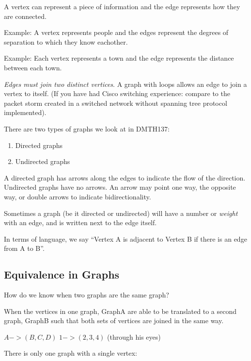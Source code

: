 A vertex can represent a piece of information and the edge represents how they
are connected.

Example: A vertex represents people and the edges represent the degrees of
separation to which they know eachother.

Example: Each vertex represents a town and the edge represents the distance
between each town.

\emph{Edges must join two distinct vertices}. A graph with loops allows an edge
to join a vertex to itself. (If you have had Cisco switching experience: compare to the
packet storm created in a switched network without spanning tree protocol
implemented).

There are two types of graphs we look at in DMTH137:
\begin{enumerate}
  \item Directed graphs
  \item Undirected graphs
\end{enumerate}

A directed graph has arrows along the edges to indicate the flow of the
direction. Undirected graphs have no arrows. An arrow may point one way, the
opposite way, or double arrows to indicate bidirectionality.



Sometimes a graph (be it directed or undirected) will have a number or
\emph{weight} with an edge, and is written next to the edge itself.


In terms of language, we say ``Vertex A is adjacent to Vertex B if there is an
edge from A to B''.

\subsection{Equivalence in Graphs}
How do we know when two graphs are the same graph?

When the vertices in one graph, GraphA are able to be translated to a second
graph, GraphB such that both sets of vertices are joined in the same way.

$ A-> (B,C,D) $ %
$ 1-> (2,3,4) $ %
(through his eyes)

There is only one graph with a single vertex:
\begin{tikzpicture}
\end{tikzpicture}


